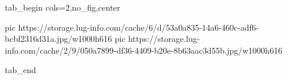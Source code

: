  
 
 
 
 


\ifcmt
  tab_begin cols=2,no_fig,center

     pic https://storage.lug-info.com/cache/6/d/53a0a835-14a6-460c-adf6-bcbf2316d31a.jpg/w1000h616%
		 pic https://storage.lug-info.com/cache/2/9/050a7899-df36-4409-b20e-8b63aac3d55b.jpg/w1000h616%

  tab_end
\fi
